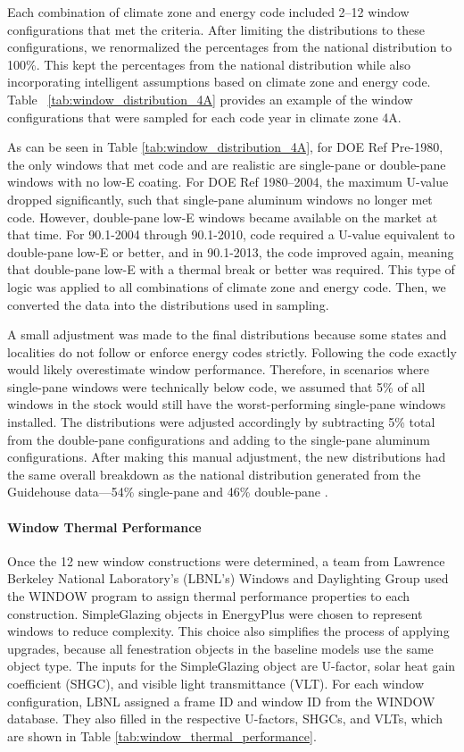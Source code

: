 Each combination of climate zone and energy code included 2--12 window configurations that met the criteria. After limiting the distributions to these configurations, we renormalized the percentages from the national distribution to 100\%. This kept the percentages from the national distribution while also incorporating intelligent assumptions based on climate zone and energy code. Table ~\ref{tab:window_distribution_4A} provides an example of the window configurations that were sampled for each code year in climate zone 4A.



As can be seen in Table \ref{tab:window_distribution_4A}, for DOE Ref Pre-1980, the only windows that met code and are realistic are single-pane or double-pane windows with no low-E coating. For DOE Ref 1980--2004, the maximum U-value dropped significantly, such that single-pane aluminum windows no longer met code. However, double-pane low-E windows became available on the market at that time. For 90.1-2004 through 90.1-2010, code required a U-value equivalent to double-pane low-E or better, and in 90.1-2013, the code improved again, meaning that double-pane low-E with a thermal break or better was required. This type of logic was applied to all combinations of climate zone and energy code. Then, we converted the data into the distributions used in sampling.

A small adjustment was made to the final distributions because some states and localities do not follow or enforce energy codes strictly. Following the code exactly would likely overestimate window performance. Therefore, in scenarios where single-pane windows were technically below code, we assumed that 5\% of all windows in the stock would still have the worst-performing single-pane windows installed. The distributions were adjusted accordingly by subtracting 5\% total from the double-pane configurations and adding to the single-pane aluminum configurations. After making this manual adjustment, the new distributions had the same overall breakdown as the national distribution generated from the Guidehouse data---54\% single-pane and 46\% double-pane .

\paragraph{Window Thermal Performance}
Once the 12 new window constructions were determined, a team from Lawrence Berkeley National Laboratory's (LBNL’s) Windows and Daylighting Group used the WINDOW program to assign thermal performance properties to each construction. SimpleGlazing objects in EnergyPlus were chosen to represent windows to reduce complexity. This choice also simplifies the process of applying upgrades, because all fenestration objects in the baseline models use the same object type. The inputs for the SimpleGlazing object are U-factor, solar heat gain coefficient (SHGC), and visible light transmittance (VLT). For each window configuration, LBNL assigned a frame ID and window ID from the WINDOW database. They also filled in the respective U-factors, SHGCs, and VLTs, which are shown in Table \ref{tab:window_thermal_performance}.

